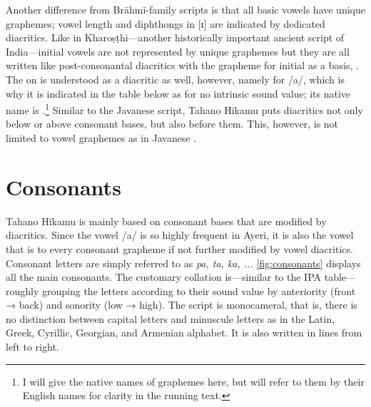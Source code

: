 Another difference from Brāhmī-family scripts is that all basic vowels have 
unique graphemes; vowel length and diphthongs in [ɪ] are indicated by dedicated 
diacritics. Like in Kharoṣṭhī---another historically important 
ancient script of India---initial vowels are not represented by unique 
graphemes but they are all written like post-consonantal diacritics with the 
grapheme for initial  as a basis,  \citep[377]{salomon1996}. The 
 on  is understood as a diacritic as well, however, namely for 
/a/, which is why it is indicated in the table below as   for no 
intrinsic sound value; its native name is 
.\footnote{I will give the native names of graphemes 
here, but will refer to them by their English names for clarity in the 
running text.} Similar to the Javanese script, Tahano Hikamu puts diacritics not 
only below or above consonant bases, but also before them. This, however, is not 
limited to vowel graphemes as in Javanese \citep[478]{kuipersmcdermott1996}.

\section{Consonants}

Tahano Hikamu is mainly based on consonant bases that are modified by 
diacritics. Since the vowel /a/ is so highly frequent in Ayeri, it is also the 
vowel that is  to every consonant grapheme if not further modified 
by vowel diacritics. Consonant letters are simply referred to as \textit{pa, ta, 
ka, ...} \autoref{fig:consonants} displays all the main consonants. The 
customary collation is---similar to the IPA table---roughly grouping the letters 
according to their sound value by anteriority (front → back) and sonority (low → 
high). The script is monocameral, that is, there is no distinction between 
capital letters and minuscule letters as in the Latin, Greek, Cyrillic, 
Georgian, and Armenian alphabet. It is also written in lines from left to right.


